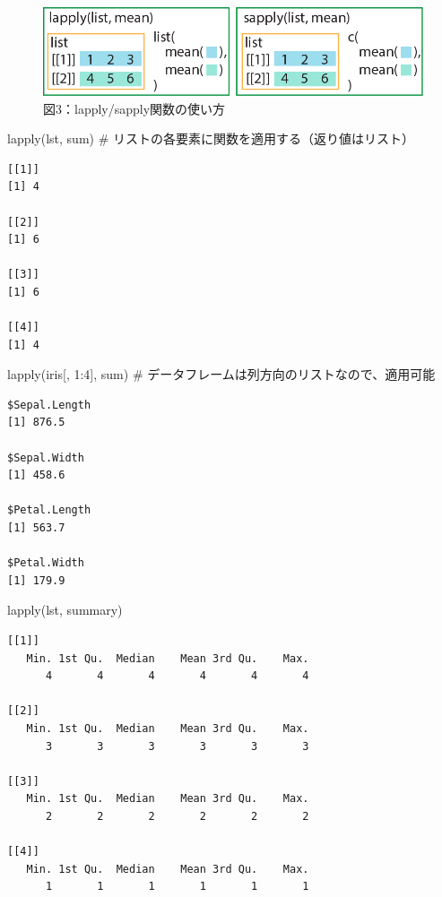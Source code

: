\documentclass[
  letterpaper,
  DIV=11,
  numbers=noendperiod]{scrreprt}
\newenvironment{Shaded}{\begin{snugshade}}{\end{snugshade}}
\newcommand{\CommentTok}[1]{\textcolor[rgb]{0.37,0.37,0.37}{#1}}
\newcommand{\DecValTok}[1]{\textcolor[rgb]{0.68,0.00,0.00}{#1}}
\newcommand{\FunctionTok}[1]{\textcolor[rgb]{0.28,0.35,0.67}{#1}}
\newcommand{\NormalTok}[1]{\textcolor[rgb]{0.00,0.23,0.31}{#1}}
\newcommand{\SpecialCharTok}[1]{\textcolor[rgb]{0.37,0.37,0.37}{#1}}
\begin{document}
\begin{figure}

{\centering \includegraphics{././image/chapter15_lapply.png}

}

\caption{図3：lapply/sapply関数の使い方}

\end{figure}

\begin{Shaded}
\begin{Highlighting}[]
\FunctionTok{lapply}\NormalTok{(lst, sum) }\CommentTok{\# リストの各要素に関数を適用する（返り値はリスト）}
\end{Highlighting}
\end{Shaded}

\begin{verbatim}
[[1]]
[1] 4

[[2]]
[1] 6

[[3]]
[1] 6

[[4]]
[1] 4
\end{verbatim}

\begin{Shaded}
\begin{Highlighting}[]
\FunctionTok{lapply}\NormalTok{(iris[, }\DecValTok{1}\SpecialCharTok{:}\DecValTok{4}\NormalTok{], sum) }\CommentTok{\# データフレームは列方向のリストなので、適用可能}
\end{Highlighting}
\end{Shaded}

\begin{verbatim}
$Sepal.Length
[1] 876.5

$Sepal.Width
[1] 458.6

$Petal.Length
[1] 563.7

$Petal.Width
[1] 179.9
\end{verbatim}

\begin{Shaded}
\begin{Highlighting}[]
\FunctionTok{lapply}\NormalTok{(lst, summary)}
\end{Highlighting}
\end{Shaded}

\begin{verbatim}
[[1]]
   Min. 1st Qu.  Median    Mean 3rd Qu.    Max. 
      4       4       4       4       4       4 

[[2]]
   Min. 1st Qu.  Median    Mean 3rd Qu.    Max. 
      3       3       3       3       3       3 

[[3]]
   Min. 1st Qu.  Median    Mean 3rd Qu.    Max. 
      2       2       2       2       2       2 

[[4]]
   Min. 1st Qu.  Median    Mean 3rd Qu.    Max. 
      1       1       1       1       1       1 
\end{verbatim}
\end{document}
